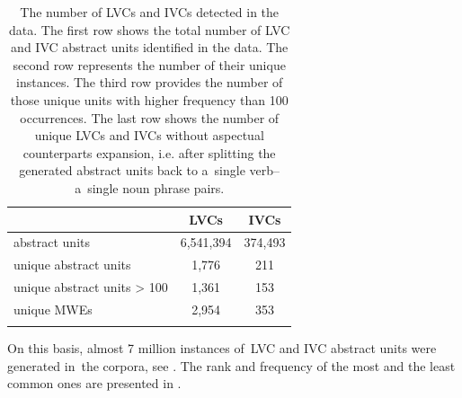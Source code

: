 \documentclass[output=paper
,modfonts
,nonflat]{langsci/langscibook}
\begin{document}
\begin{table}[tb]
\centering
\caption{The number of LVCs and IVCs detected in the data. The first row shows 
the total number of LVC and IVC abstract units identified in the data. The second 
row represents the number of their unique instances. The third row provides the 
number of those unique units with higher frequency than 100 occurrences. The 
last row shows the number of unique LVCs and IVCs without aspectual 
counterparts expansion, i.e. after splitting the generated abstract units back 
to a~single verb--a~single noun phrase pairs.}

\label{data_preprocessing}
\begin{tabular}{lcc}
\lsptoprule        & LVCs        & IVCs \\ \midrule
abstract units     & 6,541,394   & 374,493    \\ %
unique abstract units       & 1,776       &  211    \\ %
unique abstract units > 100 & 1,361       &  153    \\ %
unique MWEs        & 2,954       & 353    \\ \lspbottomrule
\end{tabular}
\end{table}


On this basis, almost 7 million instances of~LVC and IVC abstract units were 
generated in~the corpora, see . The rank and 
frequency of the most and the least common ones are presented in 
.
\end{document}
